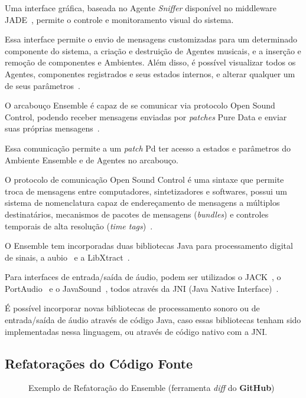 \documentclass[a4paper, 11pt, twoside]{article}
\begin{document}
\begin{multicols}{2}
Uma interface gráfica, baseada no Agente \textit{Sniffer} disponível no middleware 
JADE~\cite{belli99}, permite o controle e monitoramento visual do sistema.

Essa interface permite o envio de mensagens customizadas para um determinado 
componente do sistema, a criação e destruição de Agentes musicais, e a inserção e 
remoção de componentes e Ambientes. Além disso, é possível visualizar todos os 
Agentes, componentes registrados e seus estados internos, e alterar qualquer um de 
seus parâmetros~\cite{leandro11}.

O arcabouço Ensemble é capaz de se comunicar via protocolo Open Sound 
Control, podendo receber mensagens enviadas por \textit{patches}
Pure Data e enviar suas próprias mensagens~\cite{leandro11}. 

Essa comunicação permite a um \textit{patch} Pd ter acesso a estados e 
parâmetros do Ambiente Ensemble e de Agentes no arcabouço.

O protocolo de comunicação Open Sound Control é uma sintaxe que permite troca de 
mensagens entre computadores, sintetizadores e softwares, possui um sistema de 
nomenclatura capaz de endereçamento de mensagens a múltiplos destinatários, 
mecanismos de pacotes de mensagens (\textit{bundles}) e controles 
temporais de alta resolução (\textit{time tags})~\cite{wright97}.

O Ensemble tem incorporadas duas bibliotecas Java para processamento digital de 
sinais, a aubio~\cite{aubio01} e a LibXtract~\cite{libx01}.

Para interfaces de entrada/saída de áudio, podem ser utilizados o 
JACK~\cite{jack01}, o PortAudio~\cite{port01} e o JavaSound~\cite{jsnd01}, 
todos através da JNI (Java Native Interface)~\cite{JNI}.

É possível incorporar novas bibliotecas de processamento sonoro ou de 
entrada/saída de áudio através de código Java, caso essas bibliotecas
tenham sido implementadas nessa linguagem, ou através de código nativo
com a JNI.

\subsection{Refatorações do Código Fonte}\label{sec:refatoracoes}

\begin{figure}[H]
  \centering
  \caption{Exemplo de Refatoração do Ensemble (ferramenta \textit{diff} 
  do \textbf{GitHub})}
  \label{fig2}
\end{figure}


\end{multicols}
\end{document}
